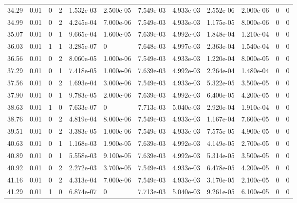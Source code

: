 \documentclass[preview]{standalone}
\begin{document}
{{{\begin{tabular}{L{1.2cm}C{1.2cm} C{0.3cm}C{0.5cm} C{1.4cm}C{1.4cm} C{1.4cm}C{1.4cm} C{1.6cm}C{1.6cm} C{1.6cm}C{1.6cm}}
  34.29  &  0.01  & 0     &  2 &  1.532e-03  & 2.500e-05  &  7.549e-03&   4.933e-03& 2.552e-06 & 2.000e-06   &  0 & 0  \\ 
  34.99  &  0.01  & 0     &  2 &  4.245e-04  & 7.000e-06  &  7.549e-03&   4.933e-03& 1.175e-05 & 8.000e-06   &  0 & 0  \\ 
  35.07  &  0.01  & 0     &  1 &  9.665e-04  & 1.600e-05  &  7.639e-03&   4.992e-03& 1.848e-04 & 1.210e-04   &  0 & 0  \\ 
  36.03  &  0.01  & 1     &  1 &  3.285e-07  & 0  &  7.648e-03&   4.997e-03& 2.363e-04 & 1.540e-04   &  0 & 0  \\ 
  36.56  &  0.01  & 0     &  2 &  8.060e-05  & 1.000e-06  &  7.549e-03&   4.933e-03& 1.220e-04 & 8.000e-05   &  0 & 0  \\ 
  37.29  &  0.01  & 0     &  1 &  7.418e-05  & 1.000e-06  &  7.639e-03&   4.992e-03& 2.264e-04 & 1.480e-04   &  0 & 0  \\ 
  37.56  &  0.01  & 0     &  2 &  1.693e-04  & 3.000e-06  &  7.549e-03&   4.933e-03& 5.322e-05 & 3.500e-05   &  0 & 0  \\ 
  37.90  &  0.01  & 0     &  1 &  9.783e-05  & 2.000e-06  &  7.639e-03&   4.992e-03& 6.400e-05 & 4.200e-05   &  0 & 0  \\ 
  38.63  &  0.01  & 1     &  0 &  7.633e-07  & 0  &  7.713e-03&   5.040e-03& 2.920e-04 & 1.910e-04   &  0 & 0  \\ 
  38.76  &  0.01  & 0     &  2 &  4.819e-04  & 8.000e-06  &  7.549e-03&   4.933e-03& 1.167e-04 & 7.600e-05   &  0 & 0  \\ 
  39.51  &  0.01  & 0     &  2 &  3.383e-05  & 1.000e-06  &  7.549e-03&   4.933e-03& 7.575e-05 & 4.900e-05   &  0 & 0  \\ 
  40.63  &  0.01  & 0     &  1 &  1.168e-03  & 1.900e-05  &  7.639e-03&   4.992e-03& 4.149e-05 & 2.700e-05   &  0 & 0  \\ 
  40.89  &  0.01  & 0     &  1 &  5.558e-03  & 9.100e-05  &  7.639e-03&   4.992e-03& 5.314e-05 & 3.500e-05   &  0 & 0  \\ 
  40.92  &  0.01  & 0     &  2 &  2.272e-03  & 3.700e-05  &  7.549e-03&   4.933e-03& 6.478e-05 & 4.200e-05   &  0 & 0  \\ 
  41.16  &  0.01  & 0     &  2 &  4.313e-04  & 7.000e-06  &  7.549e-03&   4.933e-03& 3.170e-05 & 2.100e-05   &  0 & 0  \\ 
  41.29  &  0.01  & 1     &  0 &  6.874e-07  & 0  &  7.713e-03&   5.040e-03& 9.261e-05 & 6.100e-05   &  0 & 0  \\ 
\hline 
\end{tabular} 

}}}
\end{document}
